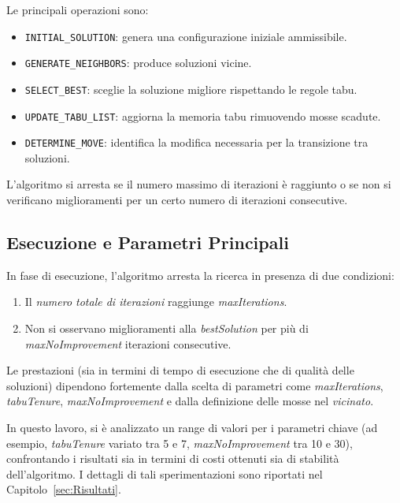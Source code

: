 Le principali operazioni sono:
\begin{itemize}
    \item \texttt{INITIAL\_SOLUTION}: genera una configurazione iniziale ammissibile.
    \item \texttt{GENERATE\_NEIGHBORS}: produce soluzioni vicine.
    \item \texttt{SELECT\_BEST}: sceglie la soluzione migliore rispettando le regole tabu.
    \item \texttt{UPDATE\_TABU\_LIST}: aggiorna la memoria tabu rimuovendo mosse scadute.
    \item \texttt{DETERMINE\_MOVE}: identifica la modifica necessaria per la transizione tra soluzioni.
\end{itemize}

L'algoritmo si arresta se il numero massimo di iterazioni è raggiunto o se non si verificano miglioramenti per un certo numero di iterazioni consecutive.

\subsection{Esecuzione e Parametri Principali}

In fase di esecuzione, l'algoritmo arresta la ricerca in presenza di due condizioni:
\begin{enumerate}
    \item Il \emph{numero totale di iterazioni} raggiunge \emph{maxIterations}.
    \item Non si osservano miglioramenti alla \emph{bestSolution} per più di \emph{maxNoImprovement} iterazioni consecutive.
\end{enumerate}

Le prestazioni (sia in termini di tempo di esecuzione che di qualità delle soluzioni) dipendono fortemente dalla scelta di parametri come \emph{maxIterations}, \emph{tabuTenure}, \emph{maxNoImprovement} e dalla definizione delle mosse nel \emph{vicinato}.

In questo lavoro, si è analizzato un range di valori per i parametri chiave (ad esempio, \emph{tabuTenure} variato tra 5 e 7, \emph{maxNoImprovement} tra 10 e 30), confrontando i risultati sia in termini di costi ottenuti sia di stabilità dell'algoritmo. I dettagli di tali sperimentazioni sono riportati nel Capitolo~\ref{sec:Risultati}.

